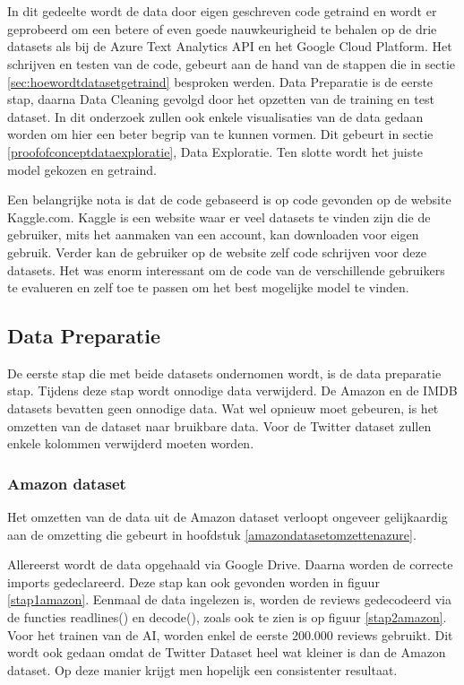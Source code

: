 \chapter{}
\label{ch:proof-of-concept}

In dit gedeelte wordt de data door eigen geschreven code getraind en wordt er geprobeerd om een betere of even goede nauwkeurigheid te behalen op de drie datasets als bij de Azure Text Analytics API en het Google Cloud Platform. Het schrijven en testen van de code, gebeurt aan de hand van de stappen die in sectie \ref{sec:hoewordtdatasetgetraind} besproken werden. Data Preparatie is de eerste stap, daarna Data Cleaning gevolgd door het opzetten van de training en test dataset. In dit onderzoek zullen ook enkele visualisaties van de data gedaan worden om hier een beter begrip van te kunnen vormen. Dit gebeurt in sectie \ref{proofofconceptdataexploratie}, Data Exploratie. Ten slotte wordt het juiste model gekozen en getraind. 

Een belangrijke nota is dat de code gebaseerd is op code gevonden op de website Kaggle.com. Kaggle is een website waar er veel datasets te vinden zijn die de gebruiker, mits het aanmaken van een account, kan downloaden voor eigen gebruik. Verder kan de gebruiker op de website zelf code schrijven voor deze datasets. Het was enorm interessant om de code van de verschillende gebruikers te evalueren en zelf toe te passen om het best mogelijke model te vinden. \autocite{Kaggle2021}

\section{Data Preparatie}
\label{proofofconceptdatapreparatie}
De eerste stap die met beide datasets ondernomen wordt, is de data preparatie stap. Tijdens deze stap wordt onnodige data verwijderd. De Amazon en de IMDB datasets bevatten geen onnodige data. Wat wel opnieuw moet gebeuren, is het omzetten van de dataset naar bruikbare data. Voor de Twitter dataset zullen enkele kolommen verwijderd moeten worden.

\subsection{Amazon dataset}
Het omzetten van de data uit de Amazon dataset verloopt ongeveer gelijkaardig aan de omzetting die gebeurt in hoofdstuk \ref{amazondatasetomzettenazure}.

Allereerst wordt de data opgehaald via Google Drive. Daarna worden de correcte imports gedeclareerd. Deze stap kan ook gevonden worden in figuur \ref{stap1amazon}. Eenmaal de data ingelezen is, worden de reviews gedecodeerd via de functies readlines() en decode(), zoals ook te zien is op figuur \ref{stap2amazon}. Voor het trainen van de AI, worden enkel de eerste 200.000 reviews gebruikt. Dit wordt ook gedaan omdat de Twitter Dataset heel wat kleiner is dan de Amazon dataset. Op deze manier krijgt men hopelijk een consistenter resultaat. 


